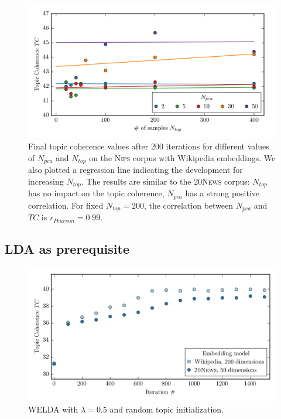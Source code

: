 \documentclass[
        a4paper,
        titlepage,
        twoside,
        parskip,
        numbers=noenddot
        ]{scrbook}
\theoremstyle{break}
\begin{document}
\begin{appendices}
  \begin{figure}[H]
         \centering
         \includegraphics[width=\textwidth]{figures/welda_gaussian_nips_pca_samples.png}
         \caption{Final topic coherence values after 200 iterations for different values of $N_{pca}$ and $N_{top}$ on the \textsc{Nips} corpus with Wikipedia embeddings. We also plotted a regression line indicating the development for increasing $N_{top}$. The results are similar to the \textsc{20News} corpus: $N_{top}$ has no impact on the topic coherence, $N_{pca}$ has a strong positive correlation. For fixed $N_{top} = 200$, the correlation between $N_{pca}$ and $TC$ is $r_{Pearson} = 0.99$.}
         \label{fig:welda_gaussian_nips_pca_samples}
  \end{figure}

  \subsection{LDA as prerequisite}
  \label{sec:appendix_lda_prerequisite}
  \begin{figure}[H]
         \centering
         \includegraphics[width=\textwidth]{figures/welda_gaussian_random_init.png}
         \caption{WELDA with $\lambda = 0.5$ and random topic initialization. }
         \label{fig:standard_lda_as_prerequisite}
  \end{figure}


\end{appendices}
\end{document}
